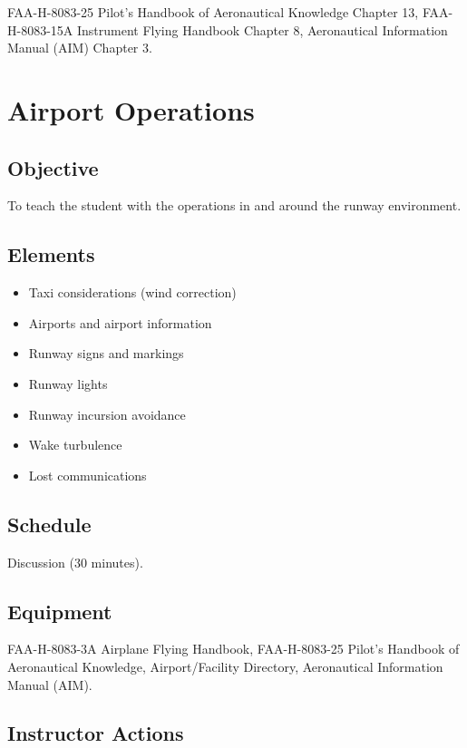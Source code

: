 \documentclass[twoside,openright]{report}
\begin{document}
FAA-H-8083-25 Pilot's Handbook of Aeronautical Knowledge Chapter 13,
FAA-H-8083-15A Instrument Flying Handbook Chapter 8, Aeronautical Information
Manual (AIM) Chapter 3.

\chapter{Airport Operations}

\section{Objective}

To teach the student with the operations in and around the runway environment.

\section{Elements}

\begin{itemize}
  \item Taxi considerations (wind correction)
  \item Airports and airport information
  \item Runway signs and markings
  \item Runway lights
  \item Runway incursion avoidance
  \item Wake turbulence
  \item Lost communications
\end{itemize}

\section{Schedule}

Discussion (30 minutes).

\section{Equipment}

FAA-H-8083-3A Airplane Flying Handbook, FAA-H-8083-25 Pilot's Handbook of
Aeronautical Knowledge, Airport/Facility Directory, Aeronautical Information
Manual (AIM).

\section{Instructor Actions}
\end{document}
